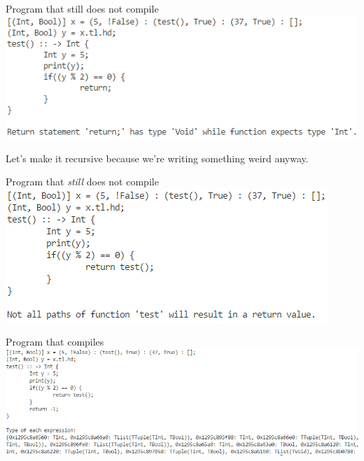 \documentclass[10pt]{beamer}
\begin{document}
\begin{frame}{Program that still does not compile}
    \includegraphics[width=\textwidth]{presentation2/test5.png}
    
    Let's make it recursive because we're writing something weird anyway.
\end{frame}

\begin{frame}{Program that \textit{still} does not compile}
    \includegraphics[width=\textwidth]{presentation2/test6.png}
\end{frame}

\begin{frame}{Program that compiles}
    \includegraphics[width=\textwidth]{presentation2/test7.png}
\end{frame}
\end{document}
